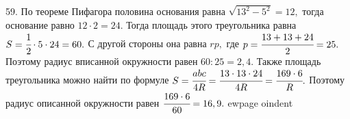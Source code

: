 59. По теореме Пифагора половина основания равна $\sqrt{13^2-5^2}=12,$ тогда основание равно $12\cdot2=24.$ Тогда площадь этого треугольника равна $S=\cfrac{1}{2}\cdot5\cdot24=60.$ С другой стороны она равна $rp,$ где $p=\cfrac{13+13+24}{2}=25.$ Поэтому радиус вписанной окружности равен $60:25=2,4.$ Также площадь треугольника можно найти по формуле $S=\cfrac{abc}{4R}=\cfrac{13\cdot13\cdot24}{4R}=\cfrac{169\cdot6}{R}.$ Поэтому радиус описанной окружности равен $\cfrac{169\cdot6}{60}=16,9.$
ewpage
oindent
